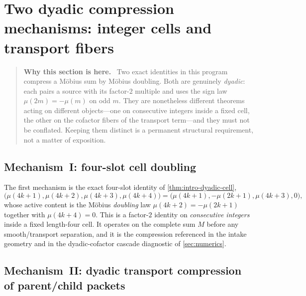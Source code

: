 \documentclass[11pt]{article}
\theoremstyle{definition}
\theoremstyle{remark}
\newcommand{\1}{\mathbf{1}}
\newenvironment{motivation}
  {\begin{quote}\small\color{ovvogray}\textbf{Why this section is here.}\ }
  {\end{quote}}
\begin{document}
\section{Two dyadic compression mechanisms: integer cells and transport fibers}
\label{sec:two-compressions}

\begin{motivation}
Two exact identities in this program compress a M\"obius sum by M\"obius doubling.  Both are genuinely \emph{dyadic}: each pairs a source with its factor-$2$ multiple and uses the sign law $\mu(2m)=-\mu(m)$ on odd $m$.  They are nonetheless different theorems acting on different objects---one on consecutive integers inside a fixed cell, the other on the cofactor fibers of the transport term---and they must not be conflated.  Keeping them distinct is a permanent structural requirement, not a matter of exposition.
\end{motivation}

\subsection{Mechanism~I: four-slot cell doubling}

The first mechanism is the exact four-slot identity of \cref{thm:intro-dyadic-cell},
\[
 \bigl(\mu(4k+1),\mu(4k+2),\mu(4k+3),\mu(4k+4)\bigr)
 =\bigl(\mu(4k+1),-\mu(2k+1),\mu(4k+3),0\bigr),
\]
whose active content is the M\"obius \emph{doubling} law $\mu(4k+2)=-\mu(2k+1)$ together with $\mu(4k+4)=0$.  This is a factor-$2$ identity on \emph{consecutive integers} inside a fixed length-four cell.  It operates on the complete sum $M$ before any smooth/transport separation, and it is the compression referenced in the intake geometry and in the dyadic-cofactor cascade diagnostic of \cref{sec:numerics}.

\subsection{Mechanism~II: dyadic transport compression of parent/child packets}
\end{document}
